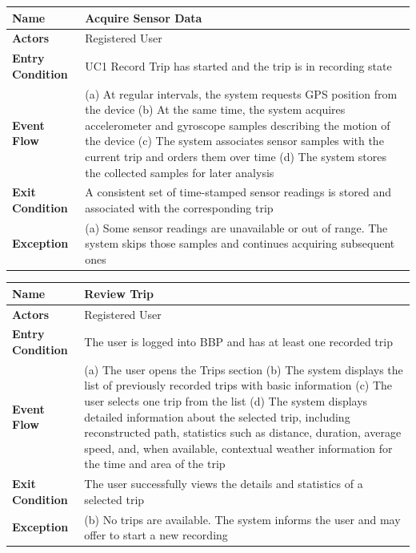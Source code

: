 \begin{table}[H]
\centering
\begin{tabular}{|p{4cm}|p{10cm}|}
\hline
\textbf{Name} & Acquire Sensor Data \\ \hline
\textbf{Actors} & Registered User \\ \hline
\textbf{Entry Condition} & UC1 Record Trip has started and the trip is in recording state \\ \hline
\textbf{Event Flow} &
(a) At regular intervals, the system requests GPS position from the device \newline
(b) At the same time, the system acquires accelerometer and gyroscope samples describing the motion of the device \newline
(c) The system associates sensor samples with the current trip and orders them over time \newline
(d) The system stores the collected samples for later analysis \\ \hline
\textbf{Exit Condition} & A consistent set of time-stamped sensor readings is stored and associated with the corresponding trip \\ \hline
\textbf{Exception} &
(a) Some sensor readings are unavailable or out of range. The system skips those samples and continues acquiring subsequent ones \\ \hline
\end{tabular}
\end{table}

\begin{table}[H]
\centering
\begin{tabular}{|p{4cm}|p{10cm}|}
\hline
\textbf{Name} & Review Trip \\ \hline
\textbf{Actors} & Registered User \\ \hline
\textbf{Entry Condition} & The user is logged into BBP and has at least one recorded trip \\ \hline
\textbf{Event Flow} &
(a) The user opens the Trips section \newline
(b) The system displays the list of previously recorded trips with basic information \newline
(c) The user selects one trip from the list \newline
(d) The system displays detailed information about the selected trip, including reconstructed path, statistics such as distance, duration, average speed, and, when available, contextual weather information for the time and area of the trip \\ \hline
\textbf{Exit Condition} & The user successfully views the details and statistics of a selected trip \\ \hline
\textbf{Exception} &
(b) No trips are available. The system informs the user and may offer to start a new recording \\ \hline
\end{tabular}
\end{table}

